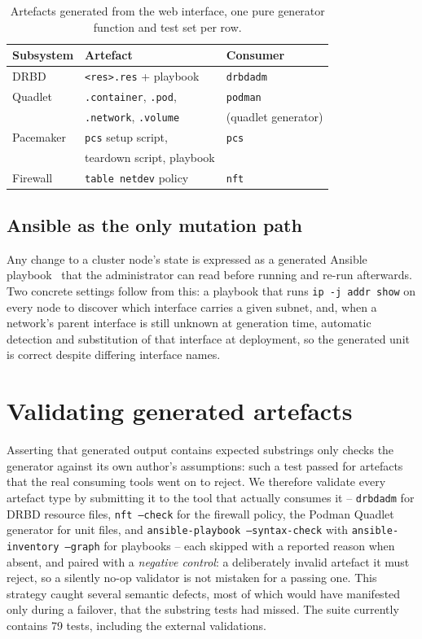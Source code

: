\documentclass{webofc}
\begin{document}
\begin{table}
\centering
\caption{Artefacts generated from the web interface, one pure generator
function and test set per row.}
\label{tab:artefacts}
\begin{tabular}{lll}
\hline
Subsystem & Artefact & Consumer \\\hline
DRBD           & \texttt{<res>.res} + playbook        & \texttt{drbdadm} \\
Quadlet        & \texttt{.container}, \texttt{.pod},  & \texttt{podman} \\
               & \texttt{.network}, \texttt{.volume}  & (quadlet generator) \\
Pacemaker      & \texttt{pcs} setup script,           & \texttt{pcs} \\
               & teardown script, playbook            & \\
Firewall       & \texttt{table netdev} policy         & \texttt{nft} \\\hline
\end{tabular}
\end{table}

\subsection{Ansible as the only mutation path}

Any change to a cluster node's state is expressed as a generated Ansible
playbook~\cite{ansible} that the administrator can read before running
and re-run afterwards. Two concrete settings follow from this: a
playbook that runs \texttt{ip -j addr show} on every node to discover
which interface carries a given subnet, and, when a network's parent
interface is still unknown at generation time, automatic detection and
substitution of that interface at deployment, so the generated unit is
correct despite differing interface names.

\section{Validating generated artefacts}
\label{sec:validation}

Asserting that generated output contains expected substrings only checks
the generator against its own author's assumptions: such a test passed
for artefacts that the real consuming tools went on to reject. We
therefore validate every artefact type by submitting it to the tool that
actually consumes it -- \texttt{drbdadm} for DRBD resource files,
\texttt{nft --check} for the firewall policy, the Podman Quadlet
generator for unit files, and \texttt{ansible-playbook --syntax-check}
with \texttt{ansible-inventory --graph} for playbooks -- each skipped
with a reported reason when absent, and paired with a \emph{negative
control}: a deliberately invalid artefact it must reject, so a silently
no-op validator is not mistaken for a passing one. This strategy caught
several semantic
defects, most of which would have manifested only during a failover,
that the substring tests had missed. The suite currently contains 79
tests, including the external validations.
\end{document}
